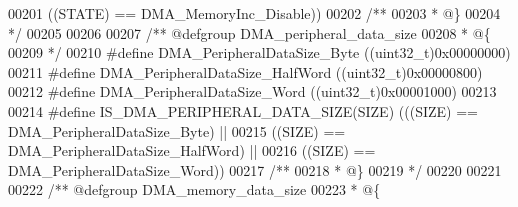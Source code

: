 \begin{DoxyCode}
00201                                         \textcolor{preprocessor}{(}\textcolor{preprocessor}{(}\textcolor{preprocessor}{STATE}\textcolor{preprocessor}{)} \textcolor{preprocessor}{==} DMA_MemoryInc_Disable\textcolor{preprocessor}{)}\textcolor{preprocessor}{)}
00202 \textcolor{comment}{/**}
00203 \textcolor{comment}{  * @\}}
00204 \textcolor{comment}{  */}
00205 
00206 
00207 \textcolor{comment}{/** @defgroup DMA\_peripheral\_data\_size }
00208 \textcolor{comment}{  * @\{}
00209 \textcolor{comment}{  */}
00210 \textcolor{preprocessor}{#}\textcolor{preprocessor}{define} \textcolor{preprocessor}{DMA\_PeripheralDataSize\_Byte}       \textcolor{preprocessor}{(}\textcolor{preprocessor}{(}\textcolor{preprocessor}{uint32\_t}\textcolor{preprocessor}{)}0x00000000\textcolor{preprocessor}{)}
00211 \textcolor{preprocessor}{#}\textcolor{preprocessor}{define} \textcolor{preprocessor}{DMA\_PeripheralDataSize\_HalfWord}   \textcolor{preprocessor}{(}\textcolor{preprocessor}{(}\textcolor{preprocessor}{uint32\_t}\textcolor{preprocessor}{)}0x00000800\textcolor{preprocessor}{)}
00212 \textcolor{preprocessor}{#}\textcolor{preprocessor}{define} \textcolor{preprocessor}{DMA\_PeripheralDataSize\_Word}       \textcolor{preprocessor}{(}\textcolor{preprocessor}{(}\textcolor{preprocessor}{uint32\_t}\textcolor{preprocessor}{)}0x00001000\textcolor{preprocessor}{)}
00213 
00214 \textcolor{preprocessor}{#}\textcolor{preprocessor}{define} \textcolor{preprocessor}{IS\_DMA\_PERIPHERAL\_DATA\_SIZE}\textcolor{preprocessor}{(}\textcolor{preprocessor}{SIZE}\textcolor{preprocessor}{)} \textcolor{preprocessor}{(}\textcolor{preprocessor}{(}\textcolor{preprocessor}{(}\textcolor{preprocessor}{SIZE}\textcolor{preprocessor}{)} \textcolor{preprocessor}{==} 
      DMA_PeripheralDataSize_Byte\textcolor{preprocessor}{)}  \textcolor{preprocessor}{||}
00215                                            \textcolor{preprocessor}{(}\textcolor{preprocessor}{(}\textcolor{preprocessor}{SIZE}\textcolor{preprocessor}{)} \textcolor{preprocessor}{==} 
      DMA_PeripheralDataSize_HalfWord\textcolor{preprocessor}{)} \textcolor{preprocessor}{||}
00216                                            \textcolor{preprocessor}{(}\textcolor{preprocessor}{(}\textcolor{preprocessor}{SIZE}\textcolor{preprocessor}{)} \textcolor{preprocessor}{==} 
      DMA_PeripheralDataSize_Word\textcolor{preprocessor}{)}\textcolor{preprocessor}{)}
00217 \textcolor{comment}{/**}
00218 \textcolor{comment}{  * @\}}
00219 \textcolor{comment}{  */}
00220 
00221 
00222 \textcolor{comment}{/** @defgroup DMA\_memory\_data\_size }
00223 \textcolor{comment}{  * @\{}

\end{DoxyCode}
